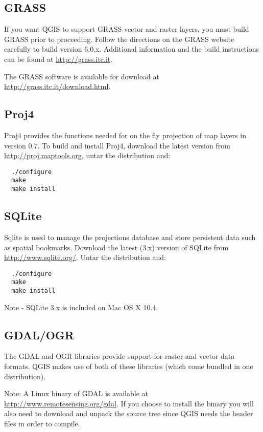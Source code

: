 \subsection{GRASS}\label{label_grass}

If you want QGIS to support GRASS vector and raster layers, you must build
GRASS prior to proceeding. Follow the directions on the GRASS website
carefully to build version 6.0.x. Additional information and the build
instructions can be found at \url{http://grass.itc.it}.
 
The GRASS software is available for download at
\url{http://grass.itc.it/download.html}.

\subsection{Proj4}\label{label_proj4}

Proj4 provides the functions needed for on the fly projection of map layers
in version 0.7. To build and install Proj4, download the latest version
from \url{http://proj.maptools.org}, untar the distribution and:

\begin{verbatim}
  ./configure
  make
  make install
\end{verbatim}


\subsection{SQLite}\label{label_sqlite}

Sqlite is used to manage the projections database and store persistent data
such as spatial bookmarks. Download the latest (3.x) version of SQLite from
\url{http://www.sqlite.org/}. Untar the distribution and:

\begin{verbatim}
  ./configure
  make
  make install
\end{verbatim}

Note - SQLite 3.x is included on Mac OS X 10.4.

\subsection{GDAL/OGR}\label{label_gdal}

The GDAL and OGR libraries provide support for raster and vector data
formats. QGIS makes use of both of these libraries (which come bundled in
one distribution).

Note: A Linux binary of GDAL is available at
\url{http://www.remotesensing.org/gdal}. If you choose to install the
binary you will also need to download and unpack the source tree since QGIS
needs the header files in order to compile.
  
